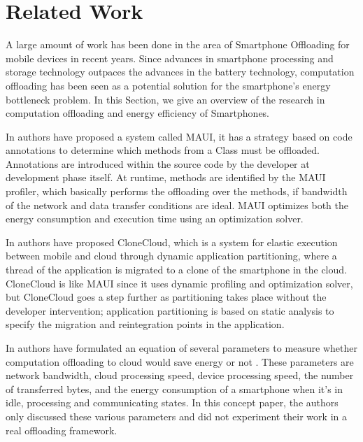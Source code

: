 \documentclass[12pt]{report}
\begin{document}
\chapter{Related Work} %
A large amount of work has been done in the area of Smartphone Offloading for mobile devices in
recent years. Since advances in smartphone processing and storage technology outpaces the advances in the battery
technology, computation offloading has been seen as a potential solution for the smartphone’s energy bottleneck problem.
In this Section, we give an overview of the research in computation offloading and energy efficiency of Smartphones.

In \cite{cuervo2010maui} authors have proposed a system called MAUI, it has a strategy based on code annotations to determine which methods from a Class must be offloaded. Annotations are introduced within the source code by the developer at development phase itself. At runtime, methods are identified by the MAUI profiler, which basically performs the offloading over the methods, if bandwidth of the network and data transfer conditions are ideal. MAUI optimizes both the energy consumption and execution
time using an optimization solver.

In \cite{chun2011clonecloud} authors have proposed CloneCloud, which is a system for elastic execution between mobile and
cloud through dynamic application partitioning, where a thread of the application is migrated to a clone of the
smartphone in the cloud. CloneCloud is like MAUI since it uses dynamic profiling and optimization solver, but CloneCloud goes a step further as partitioning takes place without the developer intervention; application partitioning is based on static analysis to specify the migration and reintegration points in the application. 

In \cite{kumar2010cloud} authors have formulated an equation of several parameters
to measure whether computation offloading to cloud would
save energy or not . These parameters are network
bandwidth, cloud processing speed, device processing
speed, the number of transferred bytes, and the energy
consumption of a smartphone when it’s in idle, processing
and communicating states. In this concept paper, the
authors only discussed these various parameters and did not
experiment their work in a real offloading framework.
\end{document}
